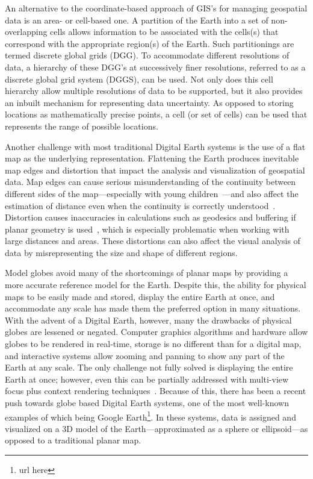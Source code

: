 An alternative to the coordinate-based approach of GIS's for managing geospatial data is an area- or cell-based one.
A partition of the Earth into a set of non-overlapping cells allows information to be associated with the cells(s) that correspond with the appropriate region(s) of the Earth.
Such partitionings are termed discrete global grids (DGG).
To accommodate different resolutions of data, a hierarchy of these DGG's at successively finer resolutions, referred to as a discrete global grid system (DGGS), can be used.
Not only does this cell hierarchy allow multiple resolutions of data to be supported, but it also provides an inbuilt mechanism for representing data uncertainty.
As opposed to storing locations as mathematically precise points, a cell (or set of cells) can be used that represents the range of possible locations.


Another challenge with most traditional Digital Earth systems is the use of a flat map as the underlying representation.
Flattening the Earth produces inevitable map edges and distortion that impact the analysis and visualization of geospatial data.
Map edges can cause serious misunderstanding of the continuity between different sides of the map---especially with young children~\cite{hennerdal2015beyond}---and also affect the estimation of distance even when the continuity is correctly understood~\cite{hruby20182000}.
Distortion causes inaccuracies in calculations such as geodesics and buffering if planar geometry is used~\cite{flaterbuffering}, which is especially problematic when working with large distances and areas.
These distortions can also affect the visual analysis of data by misrepresenting the size and shape of different regions.


Model globes avoid many of the shortcomings of planar maps by providing a more accurate reference model for the Earth.
Despite this, the ability for physical maps to be easily made and stored, display the entire Earth at once, and accommodate any scale has made them the preferred option in many situations.
With the advent of a Digital Earth, however, many the drawbacks of physical globes are lessened or negated.
Computer graphics algorithms and hardware allow globes to be rendered in real-time, storage is no different than for a digital map, and interactive systems allow zooming and panning to show any part of the Earth at any scale.
The only challenge not fully solved is displaying the entire Earth at once; however, even this can be partially addressed with multi-view focus plus context rendering techniques~\cite{mark-sherlock}.
Because of this, there has been a recent push towards globe based Digital Earth systems, one of the most well-known examples of which being Google Earth\footnote{url here}.
In these systems, data is assigned and visualized on a 3D model of the Earth---approximated as a sphere or ellipsoid---as opposed to a traditional planar map.

